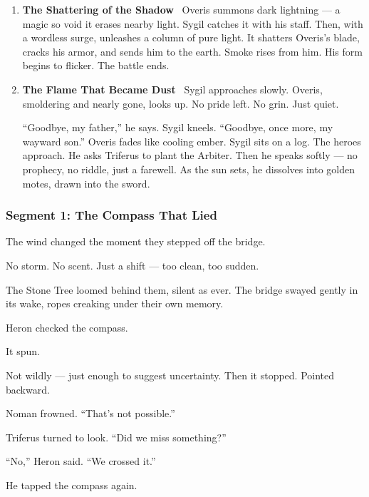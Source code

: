 \documentclass[9pt]{article}
\begin{document}
\begin{center}
\begin{enumerate}
\vspace{.3in}

\item \textbf{The Shattering of the Shadow} \
Overis summons dark lightning — a magic so void it erases nearby light. Sygil catches it with his staff. Then, with a wordless surge, unleashes a column of pure light. It shatters Overis’s blade, cracks his armor, and sends him to the earth. Smoke rises from him. His form begins to flicker. The battle ends.

\vspace{.3in}

\item \textbf{The Flame That Became Dust} \
Sygil approaches slowly. Overis, smoldering and nearly gone, looks up. No pride left. No grin. Just quiet.

“Goodbye, my father,” he says.
Sygil kneels.
“Goodbye, once more, my wayward son.”
Overis fades like cooling ember. Sygil sits on a log. The heroes approach. He asks Triferus to plant the Arbiter. Then he speaks softly — no prophecy, no riddle, just a farewell. As the sun sets, he dissolves into golden motes, drawn into the sword.

\end{enumerate}
\end{center}

\newpage

\subsubsection*{Segment 1: The Compass That Lied}

The wind changed the moment they stepped off the bridge.

No storm. No scent. Just a shift — too clean, too sudden.

The Stone Tree loomed behind them, silent as ever. The bridge swayed gently in its wake, ropes creaking under their own memory.

Heron checked the compass.

It spun.

Not wildly — just enough to suggest uncertainty. Then it stopped. Pointed backward.

Noman frowned. “That’s not possible.”

Triferus turned to look. “Did we miss something?”

“No,” Heron said. “We crossed it.”

He tapped the compass again.
\end{document}
